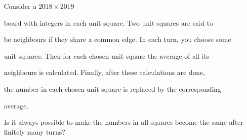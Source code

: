 Consider a $2018 \times 2019$

 board with integers in each unit square. Two unit squares are said to 

be neighbours if they share a common edge. In each turn, you choose some

 unit squares. Then for each chosen unit square the average of all its 

neighbours is calculated. Finally, after these calculations are done, 

the number in each chosen unit square is replaced by the corresponding 

average.

Is it always possible to make the numbers in all squares become the same after finitely many turns?